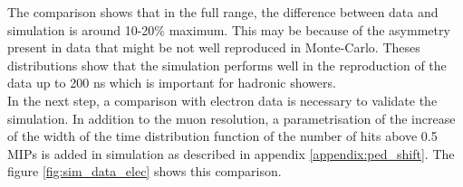 \documentclass[twoside,a4paper,11pt]{article}
\begin{document}
The comparison shows that in the full range, the difference between data and simulation is around 10-20\% maximum. This may be because of the asymmetry present in data that might be not well reproduced in Monte-Carlo. Theses distributions show that the simulation performs well in the reproduction of the data up to 200 ns which is important for hadronic showers.\\

In the next step, a comparison with electron data is necessary to validate the simulation. In addition to the muon resolution, a parametrisation of the increase of the width of the time distribution function of the number of hits above 0.5 MIPs is added in simulation as described in appendix \ref{appendix:ped_shift}. The figure \ref{fig:sim_data_elec} shows this comparison.
\begin{figure}[htbp]
	\hfill
	\hfill
	\hfill

\end{figure}
\end{document}
